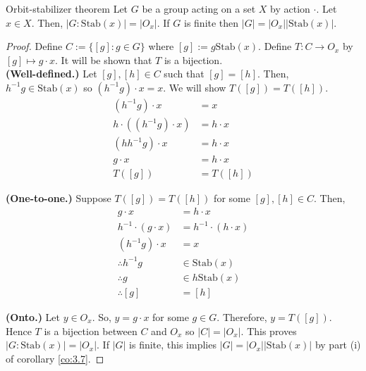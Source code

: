 \documentclass[12pt]{article}
\newcommand{\inv}{^{-1}}
\newcommand{\Stab}{\text{Stab}}
\begin{document}
	\begin{mythm}{Orbit-stabilizer theorem}{}
		Let $G$ be a group acting on a set $X$ by action $\cdot$. Let $x\in X$. Then, $|G:\Stab(x)|=|O_x|$. If $G$ is finite then $|G|=|O_x||\Stab(x)|$.
		\begin{proof}
			Define $C:=\{[g]:g\in G\}$ where $[g]:=g\Stab(x)$. Define $T:C\to O_x$ by $[g]\mapsto g\cdot x$. It will be shown that $T$ is a bijection.\\
			
			\textbf{(Well-defined.)} Let $[g], [h]\in C$ such that $[g]=[h]$. Then, $h\inv g\in\Stab(x)$ so $(h\inv g)\cdot x=x$. We will show $T([g])=T([h])$.
			\begin{align*}
				(h\inv g)\cdot x&=x\\
				h\cdot((h\inv g)\cdot x)&=h\cdot x\\
				(hh\inv g)\cdot x&=h\cdot x\\
				g\cdot x&=h\cdot x\\
				T([g])&=T([h])
			\end{align*}
			
			\textbf{(One-to-one.)} Suppose $T([g])=T([h])$ for some $[g], [h]\in C$. Then,
			\begin{align*}
				g\cdot x&=h\cdot x\\
				h\inv\cdot(g\cdot x)&=h\inv\cdot(h\cdot x)\\
				(h\inv g)\cdot x&=x\\
				\therefore h\inv g&\in\Stab(x)\\
				\therefore g&\in h\Stab(x)\\
				\therefore [g]&=[h]
			\end{align*}
			
			\textbf{(Onto.)} Let $y\in O_x$. So, $y=g\cdot x$ for some $g\in G$. Therefore, $y=T([g])$.\\
			
			Hence $T$ is a bijection between $C$ and $O_x$ so $|C|=|O_x|$. This proves $|G:\Stab(x)|=|O_x|$. If $|G|$ is finite, this implies $|G|=|O_x||\Stab(x)|$ by part (i) of corollary \ref{co:3.7}.
		\end{proof}
	\end{mythm}
	
\end{document}
